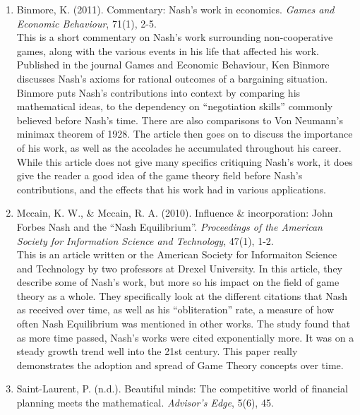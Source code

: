 \documentclass[11pt]{article}
\begin{document}
\begin{enumerate}

\item Binmore, K. (2011). Commentary: Nash's work in economics. \textit{Games and Economic Behaviour}, 71(1), 2-5.\\

This is a short commentary on Nash’s work surrounding non-cooperative games, along with the various events in his life that affected his work. Published in the journal Games and Economic Behaviour, Ken Binmore discusses Nash’s axioms for rational outcomes of a bargaining situation. Binmore puts Nash’s contributions into context by comparing his mathematical ideas, to the dependency on “negotiation skills” commonly believed before Nash’s time. There are also comparisons to Von Neumann’s minimax theorem of 1928. The article then goes on to discuss the importance of his work, as well as the accolades he accumulated throughout his career. While this article does not give many specifics critiquing Nash’s work, it does give the reader a good idea of the game theory field before Nash’s contributions, and the effects that his work had in various applications.\\

\item Mccain, K. W., \& Mccain, R. A. (2010). Influence \& incorporation: John Forbes Nash and the “Nash Equilibrium”. \textit{Proceedings of the American Society for Information Science and Technology}, 47(1), 1-2.\\

This is an article written or the American Society for Informaiton Science and Technology by two professors at Drexel University. In this article, they describe some of Nash’s work, but more so his impact on the field of game theory as a whole. They specifically look at the different citations that Nash as received over time, as well as his “obliteration” rate, a measure of how often Nash Equilibrium was mentioned in other works. The study found that as more time passed, Nash’s works were cited exponentially more. It was on a steady growth trend well into the 21st century. This paper really demonstrates the adoption and spread of Game Theory concepts over time.\\ 

\item Saint-Laurent, P. (n.d.). Beautiful minds: The competitive world of financial planning meets the mathematical.\textit{ Advisor's Edge}, 5(6), 45.\\


\end{enumerate}
\end{document}
